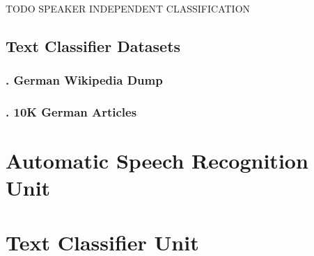 TODO SPEAKER INDEPENDENT CLASSIFICATION



\subsection{Text Classifier Datasets}
\label{meth:sub2}

\subsubsection{. German Wikipedia Dump}
\label{meth:subsub4}
\subsubsection{. 10K German Articles}
\label{meth:subsub5}


\section{Automatic Speech Recognition Unit} 
\label{meth:s3}

\section{Text Classifier Unit} 
\label{meth:s4}
